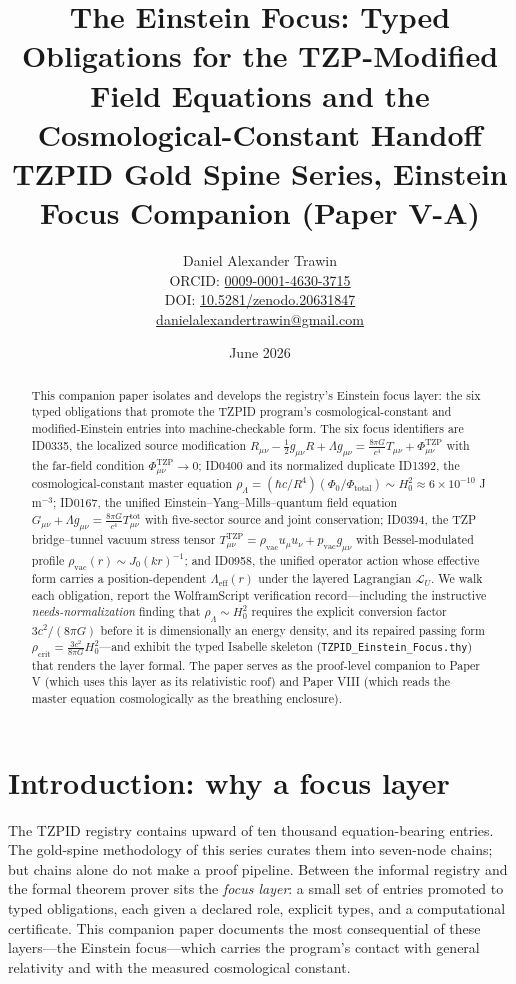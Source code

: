 \documentclass[11pt]{article}
\title{The Einstein Focus: Typed Obligations for the TZP-Modified Field Equations and the Cosmological-Constant Handoff\\[0.6em]
\large TZPID Gold Spine Series, Einstein Focus Companion (Paper V-A)}
\author{Daniel Alexander Trawin\\
\small ORCID: \href{https://orcid.org/0009-0001-4630-3715}{0009-0001-4630-3715}\\
\small DOI: \href{https://doi.org/10.5281/zenodo.20631847}{10.5281/zenodo.20631847}\\
\small \href{mailto:danielalexandertrawin@gmail.com}{danielalexandertrawin@gmail.com}}
\date{June 2026}
\theoremstyle{remark}
\begin{document}
\maketitle

\begin{abstract}
This companion paper isolates and develops the registry's Einstein focus layer: the six typed obligations that promote the TZPID program's cosmological-constant and modified-Einstein entries into machine-checkable form. The six focus identifiers are ID0335, the localized source modification $R_{\mu\nu} - \frac{1}{2}g_{\mu\nu}R + \Lambda g_{\mu\nu} = \frac{8\pi G}{c^4}T_{\mu\nu} + \Phi^{\mathrm{TZP}}_{\mu\nu}$ with the far-field condition $\Phi^{\mathrm{TZP}}_{\mu\nu} \to 0$; ID0400 and its normalized duplicate ID1392, the cosmological-constant master equation $\rho_\Lambda = (\hbar c/R^4)(\Phi_0/\Phi_{\mathrm{total}}) \sim H_0^2 \approx 6 \times 10^{-10}$ J\,m$^{-3}$; ID0167, the unified Einstein--Yang--Mills--quantum field equation $G_{\mu\nu} + \Lambda g_{\mu\nu} = \frac{8\pi G}{c^4} T^{\mathrm{tot}}_{\mu\nu}$ with five-sector source and joint conservation; ID0394, the TZP bridge--tunnel vacuum stress tensor $T^{\mathrm{TZP}}_{\mu\nu} = \rho_{\mathrm{vac}} u_\mu u_\nu + p_{\mathrm{vac}} g_{\mu\nu}$ with Bessel-modulated profile $\rho_{\mathrm{vac}}(r) \sim J_0(kr)^{-1}$; and ID0958, the unified operator action whose effective form carries a position-dependent $\Lambda_{\mathrm{eff}}(r)$ under the layered Lagrangian $\mathcal{L}_U$. We walk each obligation, report the WolframScript verification record---including the instructive \emph{needs-normalization} finding that $\rho_\Lambda \sim H_0^2$ requires the explicit conversion factor $3c^2/(8\pi G)$ before it is dimensionally an energy density, and its repaired passing form $\rho_{\mathrm{crit}} = \frac{3c^2}{8\pi G}H_0^2$---and exhibit the typed Isabelle skeleton (\texttt{TZPID\_Einstein\_Focus.thy}) that renders the layer formal. The paper serves as the proof-level companion to Paper V (which uses this layer as its relativistic roof) and Paper VIII (which reads the master equation cosmologically as the breathing enclosure).
\end{abstract}

\section{Introduction: why a focus layer}
\label{sec:intro}

The TZPID registry contains upward of ten thousand equation-bearing entries. The gold-spine methodology of this series curates them into seven-node chains; but chains alone do not make a proof pipeline. Between the informal registry and the formal theorem prover sits the \emph{focus layer}: a small set of entries promoted to typed obligations, each given a declared role, explicit types, and a computational certificate. This companion paper documents the most consequential of these layers---the Einstein focus---which carries the program's contact with general relativity and with the measured cosmological constant.
\end{document}
